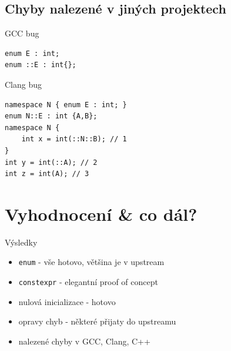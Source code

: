 \documentclass[11pt]{beamer}
\begin{document}
\subsection{Chyby nalezené v jiných projektech}

\begin{frame}[fragile=singleslide]{GCC bug}
\begin{lstlisting}
enum E : int;
enum ::E : int{};
\end{lstlisting}
\end{frame}

%
\begin{frame}[fragile=singleslide]{Clang bug}
\begin{lstlisting}
namespace N { enum E : int; }
enum N::E : int {A,B};
namespace N {
    int x = int(::N::B); // 1
}
int y = int(::A); // 2
int z = int(A); // 3
\end{lstlisting}
\end{frame}


\section{Vyhodnocení \& co dál?}

\begin{frame}{Výsledky}
\begin{itemize}
\pause \item \texttt{enum} - vše hotovo, většina je v upstream
\pause \item \texttt{constexpr} - elegantní proof of concept
\pause \item nulová inicializace - hotovo
\pause \item opravy chyb - některé přijaty do upstreamu
\pause \item nalezené chyby v GCC, Clang, C++
\end{itemize}
\end{frame}
\end{document}
